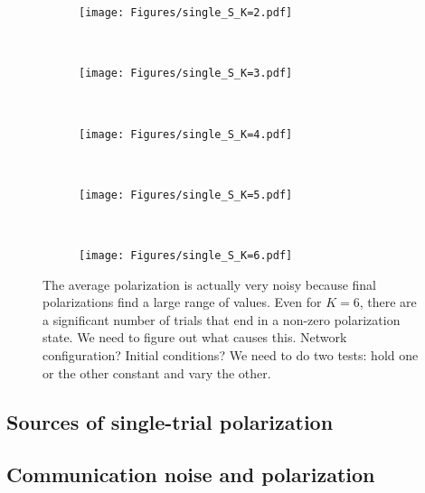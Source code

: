 \documentclass[11pt,letterpaper]{article}
\begin{document}

\begin{figure}[h!]
  \centering
  \begin{subfigure}[t]{\textwidth}
    \centering
    \texttt{[image: Figures/single\_S\_K=2.pdf]}
  \end{subfigure} \\
  \begin{subfigure}[t]{0.49\textwidth}
      \centering
      \texttt{[image: Figures/single\_S\_K=3.pdf]}
  \end{subfigure}
  ~
  \begin{subfigure}[t]{0.49\textwidth}
      \centering
      \texttt{[image: Figures/single\_S\_K=4.pdf]}
  \end{subfigure} \\
  \begin{subfigure}[t]{0.49\textwidth}
      \centering
      \texttt{[image: Figures/single\_S\_K=5.pdf]}
  \end{subfigure}
  ~
  \begin{subfigure}[t]{0.49\textwidth}
      \centering
      \texttt{[image: Figures/single\_S\_K=6.pdf]}
  \end{subfigure}
  \caption{The average polarization is actually very noisy because 
    final polarizations find a large range of values. Even for $K=6$, there
    are a significant number of trials that end in a non-zero polarization
    state. We need to figure out what causes this. Network configuration?
    Initial conditions? We need to do two tests: hold one or the other 
    constant and vary the other.
  }
  \label{fig:single_S_K}
\end{figure}

\subsection{Sources of single-trial polarization}


\subsection{Communication noise and polarization}
\end{document}
